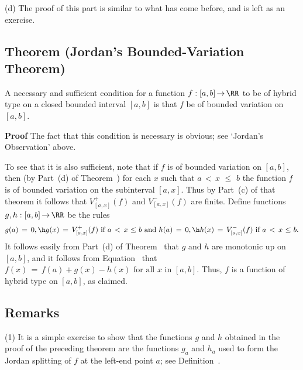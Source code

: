 \V

        (d) The proof of this part is similar to what has come before, and is left as an exercise.

\V
\V


             \subsection{\small{\bf Theorem} (Jordan's Bounded-Variation Theorem)}
            \label{ThmF40.200}

        A necessary and sufficient condition for a function $f:[a,b] \,{\rightarrow}\, {\RR}$ to be of hybrid type on a closed bounded interval $[a,b]$ is that $f$ be of bounded variation on $[a,b]$.

\V

        {\bf Proof} The fact that this condition is necessary is obvious; see `Jordan's Observation' above.

    To see that it is also sufficient, note that if $f$ is of bounded variation on $[a,b]$,
    then (by Part~(d) of Theorem~) for each $x$ such that $a\,<\,x\,\,{\leq}\,\,b$
    the function $f$ is of bounded variation on the subinterval $[a,x]$.
    Thus by Part~(c) of that theorem it follows that $V^{+}_{[a,x]}(f)$ and $V^{-}_{[a,x]}(f)$ are finite.
    Define functions $g,h:[a,b] \,{\rightarrow}\, {\RR}$ be the rules
        \begin{displaymath}
        g(a) \,=\, 0, \h g(x) \,=\, V^{+}_{[a,x]}(f) \mbox{ if $a\,<\,x\,\,{\leq}\,\,b$} \mbox{ and }        h(a) \,=\, 0, \h h(x) \,=\, V^{-}_{[a,x]}(f) \mbox{ if $a\,<\,x\,\,{\leq}\,\,b$}.
        \end{displaymath}
    It follows easily from Part~(d) of Theorem~ that $g$ and $h$  are monotonic up on $[a,b]$,
    and it follows from Equation~ that
       $ f(x) \,=\, f(a) + g(x)-h(x) \mbox{ for all $x$ in $[a,b]$}$.
    Thus, $f$ is a function of hybrid type on $[a,b]$, as claimed.

\V

             \subsection{\small{\bf Remarks}}
            \label{RemrkF40.210}

\V

\hspace*{\parindent}(1) It is a simple exercise to show that the functions $g$ and $h$ obtained in the proof of the preceding theorem are
    the functions $g_{a}$ and $h_{a}$ used to form the Jordan splitting of $f$ at the left-end point $a$; see Definition~.

